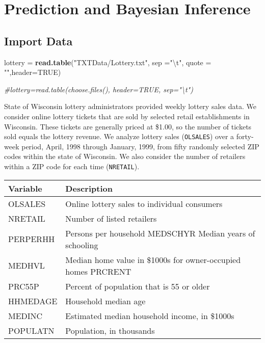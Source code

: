 \documentclass[]{book}
\newenvironment{Shaded}{\begin{snugshade}}{\end{snugshade}}
\newcommand{\CharTok}[1]{\textcolor[rgb]{0.31,0.60,0.02}{#1}}
\newcommand{\CommentTok}[1]{\textcolor[rgb]{0.56,0.35,0.01}{\textit{#1}}}
\newcommand{\DataTypeTok}[1]{\textcolor[rgb]{0.13,0.29,0.53}{#1}}
\newcommand{\KeywordTok}[1]{\textcolor[rgb]{0.13,0.29,0.53}{\textbf{#1}}}
\newcommand{\NormalTok}[1]{#1}
\newcommand{\OtherTok}[1]{\textcolor[rgb]{0.56,0.35,0.01}{#1}}
\newcommand{\StringTok}[1]{\textcolor[rgb]{0.31,0.60,0.02}{#1}}
\begin{document}
\hypertarget{prediction-and-bayesian-inference}{%
\chapter{Prediction and Bayesian Inference}\label{prediction-and-bayesian-inference}}

\hypertarget{import-data-3}{%
\section{Import Data}\label{import-data-3}}

\begin{Shaded}
\begin{Highlighting}[]
\NormalTok{lottery  =}\StringTok{ }\KeywordTok{read.table}\NormalTok{(}\StringTok{"TXTData/Lottery.txt"}\NormalTok{, }\DataTypeTok{sep =}\StringTok{"}\CharTok{\textbackslash{}t}\StringTok{"}\NormalTok{, }\DataTypeTok{quote =} \StringTok{""}\NormalTok{,}\DataTypeTok{header=}\OtherTok{TRUE}\NormalTok{)}

\CommentTok{#lottery=read.table(choose.files(), header=TRUE, sep="\textbackslash{}t")}
\end{Highlighting}
\end{Shaded}

State of Wisconsin lottery administrators provided weekly lottery sales data. We consider online lottery tickets that are sold by selected retail establishments in Wisconsin. These tickets are generally priced at \$1.00, so the number of tickets sold equals the lottery revenue. We analyze lottery sales (\texttt{OLSALES}) over a forty-week period, April, 1998 through January, 1999, from fifty randomly selected ZIP codes within the state of Wisconsin. We also consider the number of retailers within a ZIP code for each time (\texttt{NRETAIL}).

\begin{longtable}[]{@{}ll@{}}
\toprule
Variable & Description\tabularnewline
\midrule
\endhead
OLSALES & Online lottery sales to individual consumers\tabularnewline
NRETAIL & Number of listed retailers\tabularnewline
PERPERHH & Persons per household MEDSCHYR Median years of schooling\tabularnewline
MEDHVL & Median home value in \$1000s for owner-occupied homes PRCRENT\tabularnewline
PRC55P & Percent of population that is 55 or older\tabularnewline
HHMEDAGE & Household median age\tabularnewline
MEDINC & Estimated median household income, in \$1000s\tabularnewline
POPULATN & Population, in thousands\tabularnewline
\bottomrule
\end{longtable}
\end{document}
